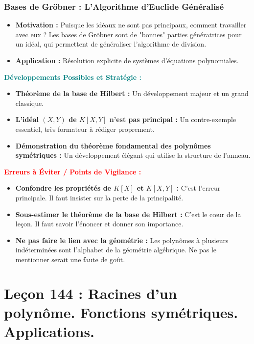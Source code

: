 \documentclass[12pt, a4paper, parskip=full]{report}
\theoremstyle{agregstyle}
\newenvironment{developpements}
  {\par\medskip\noindent\begin{oframed}\noindent\textbf{\textcolor{teal}{Développements Possibles et Stratégie :}}}
  {\end{oframed}\par\medskip}
\newenvironment{erreurs}
  {\par\medskip\noindent\begin{oframed}\noindent\textbf{\textcolor{red}{Erreurs à Éviter / Points de Vigilance :}}}
  {\end{oframed}\par\medskip}
\begin{document}
\subsection{Bases de Gröbner : L'Algorithme d'Euclide Généralisé}
\begin{itemize}
    \item \textbf{Motivation :} Puisque les idéaux ne sont pas principaux, comment travailler avec eux ? Les bases de Gröbner sont de "bonnes" parties génératrices pour un idéal, qui permettent de généraliser l'algorithme de division.
    \item \textbf{Application :} Résolution explicite de systèmes d'équations polynomiales.
\end{itemize}

\begin{developpements}
    \begin{itemize}
        \item \textbf{Théorème de la base de Hilbert :} Un développement majeur et un grand classique.
        \item \textbf{L'idéal $(X,Y)$ de $K[X,Y]$ n'est pas principal :} Un contre-exemple essentiel, très formateur à rédiger proprement.
        \item \textbf{Démonstration du théorème fondamental des polynômes symétriques :} Un développement élégant qui utilise la structure de l'anneau.
    \end{itemize}
\end{developpements}

\begin{erreurs}
    \begin{itemize}
        \item \textbf{Confondre les propriétés de $K[X]$ et $K[X,Y]$ :} C'est l'erreur principale. Il faut insister sur la perte de la principalité.
        \item \textbf{Sous-estimer le théorème de la base de Hilbert :} C'est le cœur de la leçon. Il faut savoir l'énoncer et donner son importance.
        \item \textbf{Ne pas faire le lien avec la géométrie :} Les polynômes à plusieurs indéterminées sont l'alphabet de la géométrie algébrique. Ne pas le mentionner serait une faute de goût.
    \end{itemize}
\end{erreurs}
\chapter{Leçon 144 : Racines d'un polynôme. Fonctions symétriques. Applications.}
\end{document}
